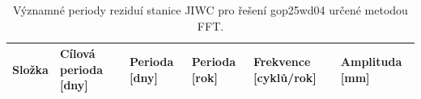 \begin{table}[htbp]
\caption{Významné periody reziduí stanice JIWC pro řešení gop25wd04 určené metodou FFT.}
\label{tab:gop25wd04_stcd_jiwc_detr_weighted_1seg_spectral_fft_significant_periods}
\begin{tabular}{llllll}
\toprule
Složka & Cílová perioda [dny] & Perioda [dny] & Perioda [rok] & Frekvence [cyklů/rok] & Amplituda [mm] \\
\midrule
\bottomrule
\end{tabular}
\end{table}
